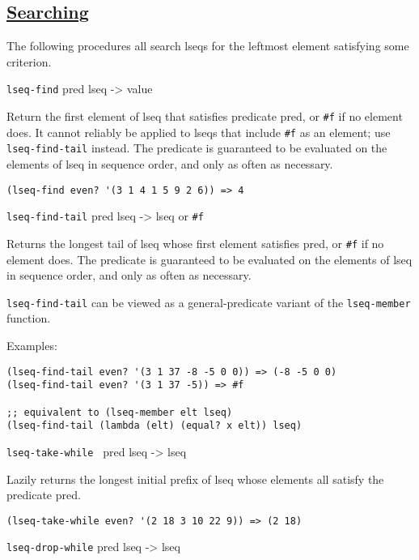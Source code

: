 \subsection{\texorpdfstring{\href{}{Searching}}{Searching}}\label{searching}

The following procedures all search lseqs for the leftmost element
satisfying some criterion.

\href{}{} \texttt{lseq-find} pred lseq -\textgreater{} value

Return the first element of lseq that satisfies predicate pred, or
\texttt{\#f} if no element does. It cannot reliably be applied to lseqs
that include \texttt{\#f} as an element; use \texttt{lseq-find-tail}
instead. The predicate is guaranteed to be evaluated on the elements of
lseq in sequence order, and only as often as necessary.

\begin{verbatim}
(lseq-find even? '(3 1 4 1 5 9 2 6)) => 4
\end{verbatim}

\href{}{} \texttt{lseq-find-tail} pred lseq -\textgreater{} lseq or
\texttt{\#f}

Returns the longest tail of lseq whose first element satisfies pred, or
\texttt{\#f} if no element does. The predicate is guaranteed to be
evaluated on the elements of lseq in sequence order, and only as often
as necessary.

\texttt{lseq-find-tail} can be viewed as a general-predicate variant of
the \texttt{lseq-member} function.

Examples:

\begin{verbatim}
(lseq-find-tail even? '(3 1 37 -8 -5 0 0)) => (-8 -5 0 0)
(lseq-find-tail even? '(3 1 37 -5)) => #f

;; equivalent to (lseq-member elt lseq)
(lseq-find-tail (lambda (elt) (equal? x elt)) lseq)
\end{verbatim}

\href{}{} \texttt{lseq-take-while\ } pred lseq -\textgreater{} lseq

Lazily returns the longest initial prefix of lseq whose elements all
satisfy the predicate pred.

\begin{verbatim}
(lseq-take-while even? '(2 18 3 10 22 9)) => (2 18)
\end{verbatim}

\href{}{} \texttt{lseq-drop-while} pred lseq -\textgreater{} lseq

